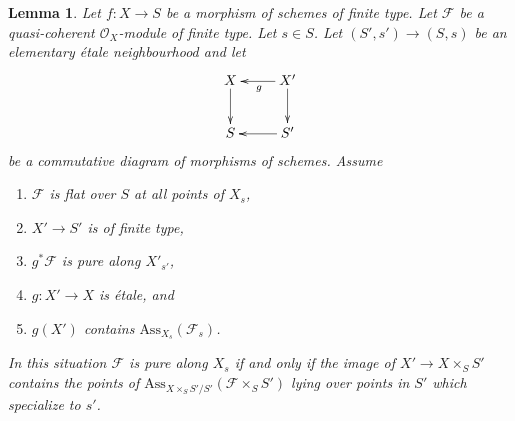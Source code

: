 \documentclass{amsart}
\theoremstyle{plain}
\newtheorem{lemma}[subsection]{Lemma}
\theoremstyle{definition}
\theoremstyle{remark}
\numberwithin{equation}{subsection}
\begin{document}
\begin{lemma}
\label{lemma-criterion}
Let $f : X \to S$ be a morphism of schemes of finite type.
Let $\mathcal{F}$ be a quasi-coherent $\mathcal{O}_X$-module
of finite type. Let $s \in S$. Let $(S', s') \to (S, s)$ be an
elementary \'etale neighbourhood and let
$$
\xymatrix{
X \ar[d] & X' \ar[l]^g \ar[d] \\
S & S' \ar[l]
}
$$
be a commutative diagram of morphisms of schemes. Assume
\begin{enumerate}
\item $\mathcal{F}$ is flat over $S$ at all points of $X_s$,
\item $X' \to S'$ is of finite type,
\item $g^*\mathcal{F}$ is pure along $X'_{s'}$,
\item $g : X' \to X$ is \'etale, and
\item $g(X')$ contains $\text{Ass}_{X_s}(\mathcal{F}_s)$.
\end{enumerate}
In this situation $\mathcal{F}$ is pure along $X_s$ if and only
if the image of $X' \to X \times_S S'$ contains the points of
$\text{Ass}_{X \times_S S'/S'}(\mathcal{F} \times_S S')$
lying over points in $S'$ which specialize to $s'$.
\end{lemma}
\end{document}
